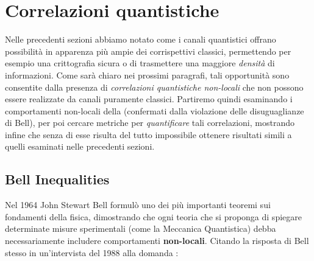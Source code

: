 \documentclass[../../InformazioneQuantistica.tex]{subfiles}
\begin{document}
\chapter{Correlazioni quantistiche}
Nelle precedenti sezioni abbiamo notato come i canali quantistici offrano possibilità in apparenza più ampie dei corrispettivi classici, permettendo per esempio una crittografia sicura o di trasmettere una maggiore \textit{densità} di informazioni. Come sarà chiaro nei prossimi paragrafi, tali opportunità sono consentite dalla presenza di \textit{correlazioni quantistiche non-locali} che non possono essere realizzate da canali puramente classici. Partiremo quindi esaminando i comportamenti non-locali della \MQ (confermati dalla violazione delle disuguaglianze di Bell), per poi cercare metriche per \textit{quantificare} tali correlazioni, mostrando infine che senza di esse risulta del tutto impossibile ottenere risultati simili a quelli esaminati nelle precedenti sezioni. 

\section{Bell Inequalities}

Nel 1964 John Stewart Bell formulò uno dei più importanti teoremi sui fondamenti della fisica, dimostrando che ogni teoria che si proponga di spiegare determinate misure sperimentali (come la Meccanica Quantistica) debba necessariamente includere comportamenti \textbf{non-locali}. Citando la risposta di Bell stesso in un'intervista del 1988 alla domanda : 
\begin{center} 
\end{center}
\end{document}

